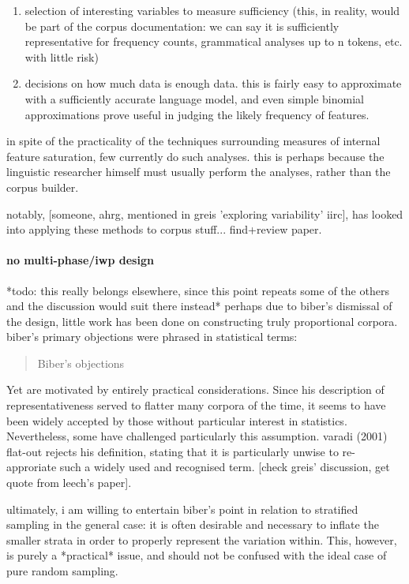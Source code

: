\begin{enumerate}
 \item selection of interesting variables to measure sufficiency (this, in reality, would be part of the corpus documentation: we can say it is sufficiently representative for frequency counts, grammatical analyses up to n tokens, etc. with little risk)
 \item decisions on how much data is enough data.  this is fairly easy to approximate with a sufficiently accurate language model, and even simple binomial approximations prove useful in judging the likely frequency of features.
\end{enumerate}

in spite of the practicality of the techniques surrounding measures of internal feature saturation, few currently do such analyses.  this is perhaps because the linguistic researcher himself must usually perform the analyses, rather than the corpus builder.

notably, [someone, ahrg, mentioned in greis 'exploring variability' iirc], has looked into applying these methods to corpus stuff... find+review paper.



\paragraph{ no multi-phase/iwp design}
*todo: this really belongs elsewhere, since this point repeats some of the others and the discussion would suit there instead*
perhaps due to biber's dismissal of the design, little work has been done on constructing truly proportional corpora.  biber's primary objections were phrased in statistical terms:

\begin{quotation}
Biber's objections
\end{quotation}

Yet are motivated by entirely practical considerations. Since his description of representativeness served to flatter many corpora of the time, it seems to have been widely accepted by those without particular interest in statistics. Nevertheless, some have challenged particularly this assumption.  varadi (2001) flat-out rejects his definition, stating that it is particularly unwise to re-approriate such a widely used and recognised term.  [check greis' discussion, get quote from leech's paper].

ultimately, i am willing to entertain biber's point in relation to stratified sampling in the general case: it is often desirable and necessary to inflate the smaller strata in order to properly represent the variation within. This, however, is purely a *practical* issue, and should not be confused with the ideal case of pure random sampling.

